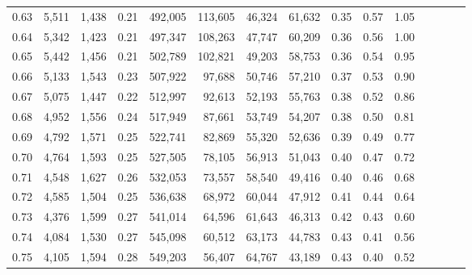 \begin{tabular}{rrrcrrrrrrrrrrr}
0.63 &   5,511 &  1,438 &                                       0.21 &  492,005 &  113,605 &   46,324 &   61,632 &  0.35 &  0.57 &                         1.05 \\
0.64 &   5,342 &  1,423 &                                       0.21 &  497,347 &  108,263 &   47,747 &   60,209 &  0.36 &  0.56 &                         1.00 \\
0.65 &   5,442 &  1,456 &                                       0.21 &  502,789 &  102,821 &   49,203 &   58,753 &  0.36 &  0.54 &                         0.95 \\
0.66 &   5,133 &  1,543 &                                       0.23 &  507,922 &   97,688 &   50,746 &   57,210 &  0.37 &  0.53 &                         0.90 \\
0.67 &   5,075 &  1,447 &                                       0.22 &  512,997 &   92,613 &   52,193 &   55,763 &  0.38 &  0.52 &                         0.86 \\
0.68 &   4,952 &  1,556 &                                       0.24 &  517,949 &   87,661 &   53,749 &   54,207 &  0.38 &  0.50 &                         0.81 \\
0.69 &   4,792 &  1,571 &                                       0.25 &  522,741 &   82,869 &   55,320 &   52,636 &  0.39 &  0.49 &                         0.77 \\
0.70 &   4,764 &  1,593 &                                       0.25 &  527,505 &   78,105 &   56,913 &   51,043 &  0.40 &  0.47 &                         0.72 \\
0.71 &   4,548 &  1,627 &                                       0.26 &  532,053 &   73,557 &   58,540 &   49,416 &  0.40 &  0.46 &                         0.68 \\
0.72 &   4,585 &  1,504 &                                       0.25 &  536,638 &   68,972 &   60,044 &   47,912 &  0.41 &  0.44 &                         0.64 \\
0.73 &   4,376 &  1,599 &                                       0.27 &  541,014 &   64,596 &   61,643 &   46,313 &  0.42 &  0.43 &                         0.60 \\
0.74 &   4,084 &  1,530 &                                       0.27 &  545,098 &   60,512 &   63,173 &   44,783 &  0.43 &  0.41 &                         0.56 \\
0.75 &   4,105 &  1,594 &                                       0.28 &  549,203 &   56,407 &   64,767 &   43,189 &  0.43 &  0.40 &                         0.52 \\

\end{tabular}
